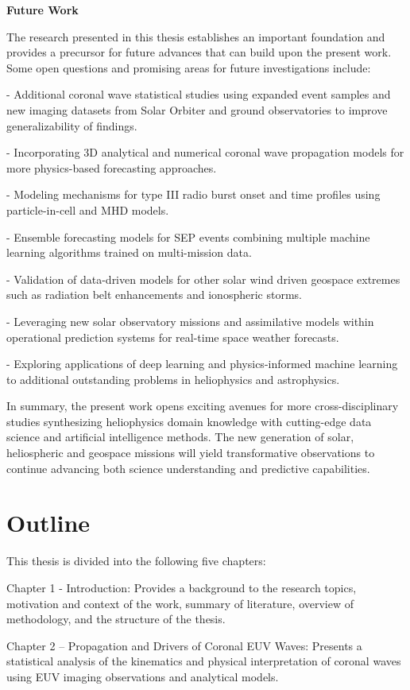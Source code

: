 \textbf{Future Work}

The research presented in this thesis establishes an important foundation and provides a precursor for future advances that can build upon the present work. Some open questions and promising areas for future investigations include:

- Additional coronal wave statistical studies using expanded event samples and new imaging datasets from Solar Orbiter and ground observatories to improve generalizability of findings.

- Incorporating 3D analytical and numerical coronal wave propagation models for more physics-based forecasting approaches. 

- Modeling mechanisms for type III radio burst onset and time profiles using particle-in-cell and MHD models. 

- Ensemble forecasting models for SEP events combining multiple machine learning algorithms trained on multi-mission data.

- Validation of data-driven models for other solar wind driven geospace extremes such as radiation belt enhancements and ionospheric storms.

- Leveraging new solar observatory missions and assimilative models within operational prediction systems for real-time space weather forecasts.

- Exploring applications of deep learning and physics-informed machine learning to additional outstanding problems in heliophysics and astrophysics.

In summary, the present work opens exciting avenues for more cross-disciplinary studies synthesizing heliophysics domain knowledge with cutting-edge data science and artificial intelligence methods. The new generation of solar, heliospheric and geospace missions will yield transformative observations to continue advancing both science understanding and predictive capabilities.


\section{Outline}

This thesis is divided into the following five chapters:

Chapter 1 - Introduction: Provides a background to the research topics, motivation and context of the work, summary of literature, overview of methodology, and the structure of the thesis. 

Chapter 2 – Propagation and Drivers of Coronal EUV Waves: Presents a statistical analysis of the kinematics and physical interpretation of coronal waves using EUV imaging observations and analytical models.

